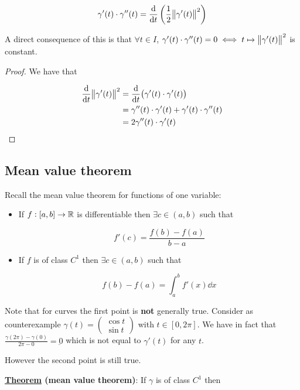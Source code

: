 \documentclass[10pt]{extarticle}
\renewcommand{\vec}[1]{\underbar{\ensuremath{#1}}}
\begin{document}
$$
    \gamma'(t) \cdot \gamma''(t) = \dv{t}\left(\frac{1}{2}\norm{\gamma'(t)}^2\right)
$$

A direct consequence of this is that $\forall t \in I$, $\gamma'(t) \cdot \gamma''(t) = 0 \iff t \mapsto \norm{\gamma'(t)}^2$ is constant.

\begin{proof}
    We have that

    \begin{align*}
        \dv{t}\norm{\gamma'(t)}^2 & = \dv{t}(\gamma'(t) \cdot \gamma'(t))                         \\
                                  & = \gamma''(t) \cdot \gamma'(t) + \gamma'(t) \cdot \gamma''(t) \\
                                  & = 2 \gamma''(t) \cdot \gamma'(t)
    \end{align*}
\end{proof}

\subsection{Mean value theorem}

Recall the mean value theorem for functions of one variable:

\begin{itemize}
    \item If $f : [a, b] \to \mathbb{R}$ is differentiable then $\exists c \in (a, b)$ such that

          $$
              f'(c) = \frac{f(b) - f(a)}{b - a}
          $$

    \item If $f$ is of class $C^1$ then $\exists c \in (a, b)$ such that

          $$
              f(b) - f(a) = \int_a^b f'(x) \dd{x}
          $$
\end{itemize}

Note that for curves the first point is \textbf{not} generally true.
Consider as counterexample $\gamma(t) = \begin{pmatrix}
        \cos t \\ \sin t
    \end{pmatrix}$ with $t \in [0, 2\pi]$.
We have in fact that $ \frac{\gamma(2\pi) - \gamma(0)}{2\pi - 0} = \vec{0}$ which is not equal to $\gamma'(t)$ for any $t$.

However the second point is still true.

\textbf{\underline{Theorem} (mean value theorem)}:
If $\gamma$ is of class $C^1$ then
\end{document}
